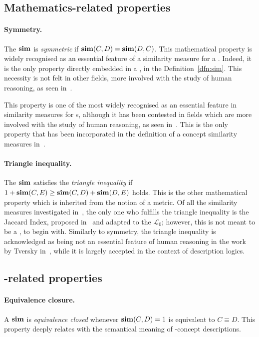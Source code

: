 \subsection{Mathematics-related properties}

\paragraph{Symmetry.}
The \csm \(\operatorname{\mathbf{sim}}\) is \emph{symmetric} if \(\operatorname{\mathbf{sim}}(C,D) = \operatorname{\mathbf{sim}}(D,C)\).
This mathematical property is widely recognised as an essential feature of a similarity measure for a \dl.
Indeed, it is the only property directly embedded in a \csm, in the Definition~\ref{dfn:sim}.
This necessity is not felt in other fields, more involved with the study of human reasoning, as seen in~\cite{Tve77}.

This property is one of the most widely recognised as an essential feature in similarity measures for \dl{}s, although it has been contested in fields which are more involved with the study of human reasoning, as seen in~\cite{Tve77}.
This is the only property that has been incorporated in the definition of a concept similarity measures in~\cite{LeTu12}.

\paragraph{Triangle inequality.}
The \csm \(\operatorname{\mathbf{sim}}\) satisfies the \emph{triangle inequality} if \(1 + \operatorname{\mathbf{sim}}(C,E) \ge \operatorname{\mathbf{sim}}(C,D) + \operatorname{\mathbf{sim}}(D,E)\) holds.
This is the other mathematical property which is inherited from the notion of a metric.
Of all the similarity measures investigated in~\cite{LeTu12}, the only one who fulfills the triangle inequality is the Jaccard Index, proposed in~\cite{Ja01} and adapted to the \dl \(\mathcal{L}_0\); however, this is not meant to be a \csm, to begin with.
Similarly to symmetry, the triangle inequality is  acknowledged as being not an essential feature of human reasoning in the work by Tversky in~\cite{Tve77}, while it is largely accepted in the context of description logics.

\subsection{\dl-related properties}

\paragraph{Equivalence closure.}
A \csm \(\operatorname{\mathbf{sim}}\) is \emph{equivalence closed} whenever \(\operatorname{\mathbf{sim}}(C,D) = 1\) is equivalent to \(C \equiv D\).
This property deeply relates with the semantical meaning of \elh-concept descriptions.

